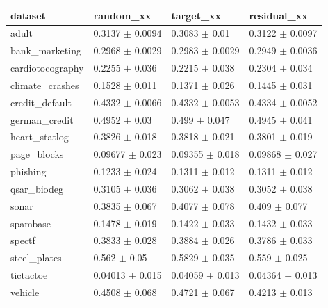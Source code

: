\begin{tabular}{llll}
\toprule
dataset & random\_xx & target\_xx & residual\_xx \\
\midrule
adult & 0.3137 $\pm$ 0.0094 & 0.3083 $\pm$ 0.01 & 0.3122 $\pm$ 0.0097 \\
bank\_marketing & 0.2968 $\pm$ 0.0029 & 0.2983 $\pm$ 0.0029 & 0.2949 $\pm$ 0.0036 \\
cardiotocography & 0.2255 $\pm$ 0.036 & 0.2215 $\pm$ 0.038 & 0.2304 $\pm$ 0.034 \\
climate\_crashes & 0.1528 $\pm$ 0.011 & 0.1371 $\pm$ 0.026 & 0.1445 $\pm$ 0.031 \\
credit\_default & 0.4332 $\pm$ 0.0066 & 0.4332 $\pm$ 0.0053 & 0.4334 $\pm$ 0.0052 \\
german\_credit & 0.4952 $\pm$ 0.03 & 0.499 $\pm$ 0.047 & 0.4945 $\pm$ 0.041 \\
heart\_statlog & 0.3826 $\pm$ 0.018 & 0.3818 $\pm$ 0.021 & 0.3801 $\pm$ 0.019 \\
page\_blocks & 0.09677 $\pm$ 0.023 & 0.09355 $\pm$ 0.018 & 0.09868 $\pm$ 0.027 \\
phishing & 0.1233 $\pm$ 0.024 & 0.1311 $\pm$ 0.012 & 0.1311 $\pm$ 0.012 \\
qsar\_biodeg & 0.3105 $\pm$ 0.036 & 0.3062 $\pm$ 0.038 & 0.3052 $\pm$ 0.038 \\
sonar & 0.3835 $\pm$ 0.067 & 0.4077 $\pm$ 0.078 & 0.409 $\pm$ 0.077 \\
spambase & 0.1478 $\pm$ 0.019 & 0.1422 $\pm$ 0.033 & 0.1432 $\pm$ 0.033 \\
spectf & 0.3833 $\pm$ 0.028 & 0.3884 $\pm$ 0.026 & 0.3786 $\pm$ 0.033 \\
steel\_plates & 0.562 $\pm$ 0.05 & 0.5829 $\pm$ 0.035 & 0.559 $\pm$ 0.025 \\
tictactoe & 0.04013 $\pm$ 0.015 & 0.04059 $\pm$ 0.013 & 0.04364 $\pm$ 0.013 \\
vehicle & 0.4508 $\pm$ 0.068 & 0.4721 $\pm$ 0.067 & 0.4213 $\pm$ 0.013 \\
\bottomrule
\end{tabular}
